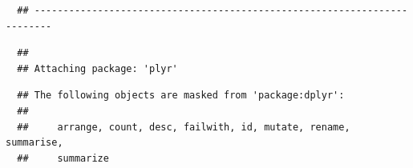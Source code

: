 \documentclass[12pt,twoside]{reedthesis}
\begin{document}
  \begin{verbatim}
  ## -------------------------------------------------------------------------
  \end{verbatim}
  
  \begin{verbatim}
  ## 
  ## Attaching package: 'plyr'
  \end{verbatim}
  
  \begin{verbatim}
  ## The following objects are masked from 'package:dplyr':
  ## 
  ##     arrange, count, desc, failwith, id, mutate, rename, summarise,
  ##     summarize
  \end{verbatim}
  
  \begin{Shaded}
  \begin{Highlighting}[]
  \StringTok{ } \NormalTok{, } \NormalTok{(}\NormalTok{, }\NormalTok{))}
  

\end{Highlighting}
\end{Shaded}
\end{document}
